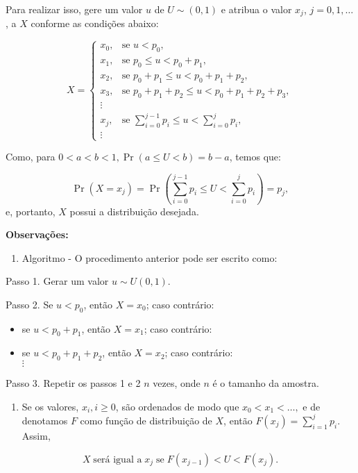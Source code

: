 \documentclass[
  letterpaper,
  DIV=11,
  numbers=noendperiod]{scrreprt}
\providecommand{\tightlist}{%
  \setlength{\itemsep}{0pt}\setlength{\parskip}{0pt}}\usepackage{longtable,booktabs,array}
\begin{document}
Para realizar isso, gere um valor \(u\) de \(U\sim(0,1)\) e atribua o
valor \(x_j\), \(j=0,1,\ldots\), a \(X\) conforme as condições abaixo:

\[X = \begin{cases}
x_0, & \text{se } u < p_0, \\
x_1, & \text{se } p_0 \leq u < p_0+p_1, \\
x_2, & \text{se } p_0+p_1 \leq u < p_0+p_1+p_2, \\
x_3, & \text{se } p_0+p_1+p_2 \leq u < p_0+p_1+p_2+p_3, \\
\vdots & \\
x_j, & \text{se } \displaystyle \sum_{i=0}^{j-1} p_i \leq u < \sum_{i=0}^{j} p_i, \\
\vdots &
\end{cases}\]

Como, para \(0 < a < b < 1, \Pr(a \leq U < b) = b-a\), temos que:

\[\Pr(X = x_j) = \Pr\left(\sum\limits_{i=0}^{j-1}p_i \leq U < \sum\limits_{i=0}^{j}p_i\right) = p_j,\]
e, portanto, \(X\) possui a distribuição desejada.

\begin{tcolorbox}[enhanced jigsaw, toprule=.15mm, arc=.35mm, colframe=quarto-callout-important-color-frame, breakable, opacityback=0, rightrule=.15mm, bottomrule=.15mm, left=2mm, leftrule=.75mm, colback=white]

\vspace{-3mm}\textbf{Observações:}\vspace{3mm}

\begin{enumerate}
\def\labelenumi{\arabic{enumi}.}
\tightlist
\item
  Algoritmo - O procedimento anterior pode ser escrito como:
\end{enumerate}

Passo 1. Gerar um valor \(u \sim U(0,1)\).

Passo 2. Se \(u < p_0\), então \(X = x_0\); caso contrário:

\begin{itemize}
\tightlist
\item
  se \(u < p_0 + p_1\), então \(X = x_1\); caso contrário:\\
\item
  se \(u < p_0 + p_1 + p_2\), então \(X = x_2\); caso contrário:\\
  \(\vdots\)
\end{itemize}

Passo 3. Repetir os passos 1 e 2 \(n\) vezes, onde \(n\) é o tamanho da
amostra.

\begin{enumerate}
\def\labelenumi{\arabic{enumi}.}
\setcounter{enumi}{1}
\tightlist
\item
  Se os valores, \(x_i, i \geq 0\), são ordenados de modo que
  \(x_0 < x_1 < \dots,\) e de denotamos \(F\) como função de
  distribuição de \(X\), então \(F(x_j) = \sum\limits_{i=1}^{j}p_i\).
  Assim,
\end{enumerate}

\[X\; \text{será igual a}\; x_j\; \text{se}\; F(x_{j-1}) < U < F(x_j).\]

\end{tcolorbox}
\end{document}
